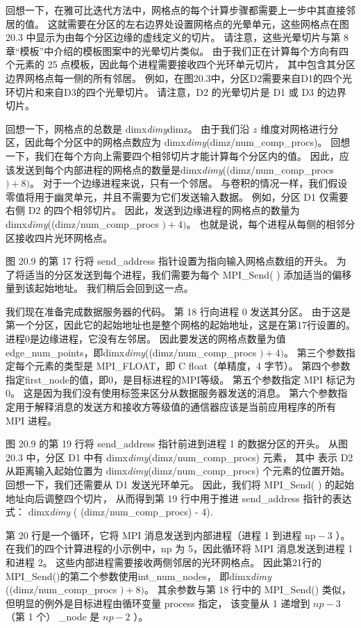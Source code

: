 回想一下，在雅可比迭代方法中，网格点的每个计算步骤都需要上一步中其直接邻居的值。 
这就需要在分区的左右边界处设置网格点的光晕单元，这些网格点在图 20.3 中显示为由每个分区边缘的虚线定义的切片。 
请注意，这些光晕切片与第 8 章“模板”中介绍的模板图案中的光晕切片类似。 
由于我们正在计算每个方向有四个元素的 25 点模板，因此每个进程需要接收四个光环单元切片，
其中包含其分区边界网格点每一侧的所有邻居。 例如，在图20.3中，分区D2需要来自D1的四个光环切片和来自D3的四个光晕切片。 
请注意，D2 的光晕切片是 D1 或 D3 的边界切片。

回想一下，网格点的总数是 dimx\textit{dimy}dimz。 
由于我们沿 $z$ 维度对网格进行分区，因此每个分区中的网格点数应为 dimx\textit{dimy}(dimz/num\_comp\_procs)。 
回想一下，我们在每个方向上需要四个相邻切片才能计算每个分区内的值。 
因此，应该发送到每个内部进程的网格点的数量是dimx\textit{dimy}((dimz/num\_comp\_procs $)+8)$。 
对于一个边缘进程来说，只有一个邻居。 与卷积的情况一样，我们假设零值将用于幽灵单元，并且不需要为它们发送输入数据。 
例如，分区 D1 仅需要右侧 D2 的四个相邻切片。 
因此，发送到边缘进程的网格点的数量为dimx\textit{dimy}((dimz/num\_comp\_procs $)+4)$。 
也就是说，每个进程从每侧的相邻分区接收四片光环网格点。

图 20.9 的第 17 行将 send\_address 指针设置为指向输入网格点数组的开头。 
为了将适当的分区发送到每个进程，我们需要为每个 MPI\_Send( ) 添加适当的偏移量到该起始地址。 我们稍后会回到这一点。

我们现在准备完成数据服务器的代码。 第 18 行向进程 0 发送其分区。 
由于这是第一个分区，因此它的起始地址也是整个网格的起始地址，这是在第17行设置的。进程0是边缘进程，它没有左邻居。 
因此要发送的网格点数量为值edge\_num\_points，即dimx\textit{dimy}((dimz/num\_comp\_procs $)+4)$。 
第三个参数指定每个元素的类型是 MPI\_FLOAT，即 C float（单精度，4 字节）。 
第四个参数指定first\_node的值，即0，是目标进程的MPI等级。 第五个参数指定 MPI 标记为 0。 
这是因为我们没有使用标签来区分从数据服务器发送的消息。 
第六个参数指定用于解释消息的发送方和接收方等级值的通信器应该是当前应用程序的所有 MPI 进程。

图 20.9 的第 19 行将 send\_address 指针前进到进程 1 的数据分区的开头。
从图 20.3 中，分区 D1 中有 dimx\textit{dimy}(dimz/num\_comp\_procs) 元素，
其中 表示 D2 从距离输入起始位置为 dimx\textit{dimy}(dimz/num\_comp\_procs) 个元素的位置开始。 
回想一下，我们还需要从 D1 发送光环单元。 因此，我们将 MPI\_Send( ) 的起始地址向后调整四个切片，
从而得到第 19 行中用于推进 send\_address 指针的表达式： dimx\textit{dimy} ( (dimz/num\_comp\_procs) - 4).

第 20 行是一个循环，它将 MPI 消息发送到内部进程（进程 1 到进程 $\mathrm{np}-3$ ）。 
在我们的四个计算进程的小示例中，np 为 5，因此循环将 MPI 消息发送到进程 1 和进程 2。
这些内部进程需要接收两侧邻居的光环网格点。 因此第21行的MPI\_Send()的第二个参数使用int\_num\_nodes，
即dimx\textit{dimy} ((dimz/num\_comp\_procs $)+8)$。 
其余参数与第 18 行中的 MPI\_Send() 类似，但明显的例外是目标进程由循环变量 process 指定，
该变量从 1 递增到 $n p-3$（第 1 个） \_node 是 $n p-2$ ）。

